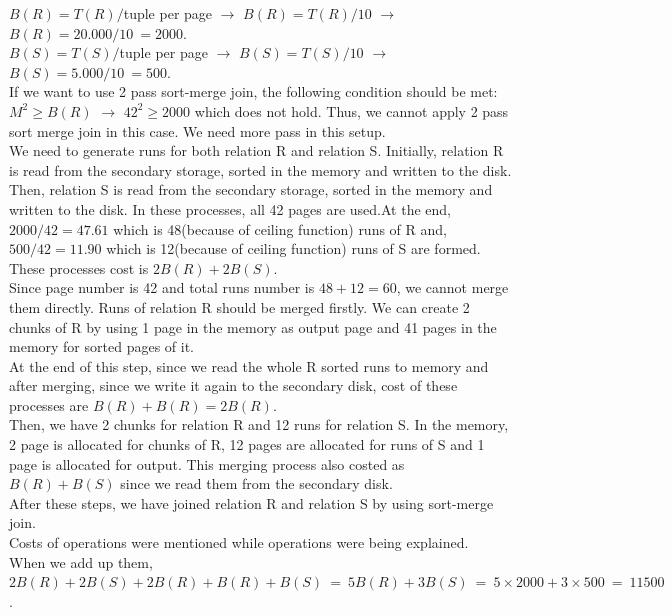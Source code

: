\documentclass[a4paper,12pt]{article}
\begin{document}
\begin{tcolorbox}
$B(R) = T(R)/$tuple per page $\rightarrow$ $B(R) = T(R)/10$ $\rightarrow$ $B(R) = 20.000/10\ = 2000$. \\
$B(S) = T(S)/$tuple per page $\rightarrow$ $B(S) = T(S)/10$ $\rightarrow$ $B(S) = 5.000/10\ = 500$.\\
If we want to use 2 pass sort-merge join, the following condition should be met:\\
$M^2 \geq B(R)$ $\rightarrow$ $42^2 \geq 2000$ which does not hold. Thus, we cannot apply 2 pass sort merge join in this case. We need more pass in this setup.\\
We need to generate runs for both relation R and relation S. Initially, relation R is read from the secondary storage, sorted in the memory and written to the disk. Then, relation S is read from the secondary storage, sorted in the memory and written to the disk. In these processes, all 42 pages are used.At the end,\\
$2000/42 = 47.61$ which is 48(because of ceiling function) runs of R and,\\
$500/42 = 11.90$ which is 12(because of ceiling function) runs of S are formed.\\ 
These processes cost is $2B(R)+2B(S)$.\\
Since page number is 42 and total runs number is $48+12=60$, we cannot merge them directly. Runs of relation R should be merged firstly. We can create 2 chunks of R by using 1 page in the memory as output page and 41 pages in the memory for sorted pages of it.\\
At the end of this step, since we read the whole R sorted runs to memory and after merging, since we write it again to the secondary disk, cost of these processes are $B(R)+B(R) = 2B(R)$.\\
Then, we have 2 chunks for relation R and 12 runs for relation S. In the memory, 2 page is allocated for chunks of R, 12 pages are allocated for runs of S and 1 page is allocated for output. This merging process also costed as $B(R)+B(S)$ since we read them from the secondary disk.\\
After these steps, we have joined relation R and relation S by using sort-merge join.\\
Costs of operations were mentioned while operations were being explained.\\ When we add up them,\\
$2B(R)+2B(S)+2B(R)+B(R)+B(S)\ =\ 5B(R)+3B(S)\ =\ 5\times 2000+ 3\times 500\ =\ 11500$. 

\end{tcolorbox}
\end{document}
